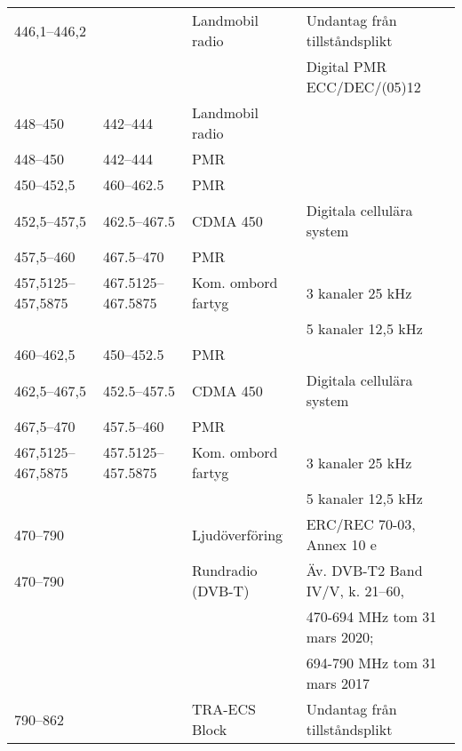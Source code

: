 \begin{landscape}
\begin{longtable}{llll}
	446,1--446,2       &                    & Landmobil radio         & Undantag från tillståndsplikt            \\
	                   &                    &                         & Digital PMR ECC/DEC/(05)12               \\
	448--450           & 442--444           & Landmobil radio         &  \\
	448--450           & 442--444           & PMR                     &  \\
	450--452,5         & 460--462.5         & PMR                     &  \\
	452,5--457,5       & 462.5--467.5       & CDMA 450                & Digitala cellulära system                \\
	457,5--460         & 467.5--470         & PMR                     &  \\
	457,5125--457,5875 & 467.5125--467.5875 & Kom. ombord fartyg      & 3 kanaler 25 kHz                         \\
	                   &                    &                         & 5 kanaler 12,5 kHz                       \\
	460--462,5         & 450--452.5         & PMR                     &  \\
	462,5--467,5       & 452.5--457.5       & CDMA 450                & Digitala cellulära system                \\
	467,5--470         & 457.5--460         & PMR                     &  \\
	467,5125--467,5875 & 457.5125--457.5875 & Kom. ombord  fartyg     & 3 kanaler 25 kHz                         \\
	                   &                    &                         & 5 kanaler 12,5 kHz                       \\
	470--790           &                    & Ljudöverföring          & ERC/REC 70-03, Annex 10 e                \\
	470--790           &                    & Rundradio (DVB-T)       & Äv. DVB-T2 Band IV/V, k. 21--60,         \\
	                   &                    &                         & 470-694 MHz tom 31 mars 2020;            \\
	                   &                    &                         & 694-790 MHz tom 31 mars 2017             \\
	790--862           &                    & TRA-ECS	Block           & Undantag från tillståndsplikt            \\

\end{longtable}
\end{landscape}

